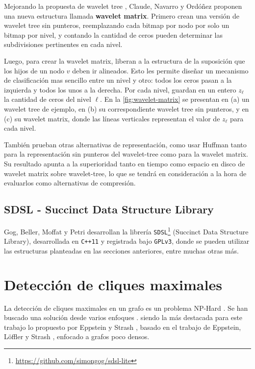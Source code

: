 Mejorando la propuesta de wavelet tree \cite{grossi2003high}, Claude, Navarro y Ordóñez \cite{claude2015wavelet} proponen una nueva estructura llamada \textbf{wavelet matrix}. Primero crean una versión de wavelet tree sin punteros, reemplazando cada bitmap por nodo por solo un bitmap por nivel, y contando la cantidad de ceros pueden determinar las subdivisiones pertinentes en cada nivel. 

Luego, para crear la wavelet matrix, liberan a la estructura de la suposición que los hijos de un nodo $v$ deben ir alineados. Esto les permite diseñar un mecanismo de clasificación mas sencillo entre un nivel y otro: todos los ceros pasan a la izquierda y todos los unos a la derecha. Por cada nivel, guardan en un entero $z_{\ell}$ la cantidad de ceros del nivel $\ell$. En la \autoref{fig:wavelet-matrix} se presentan en (a) un wavelet tree de ejemplo, en (b) su correspondiente wavelet tree sin punteros, y en (c) su wavelet matrix, donde las líneas verticales representan el valor de $z_{\ell}$ para cada nivel.



También prueban otras alternativas de representación, como usar Huffman \cite{huffman1952method} tanto para la representación sin punteros del wavelet-tree como para la wavelet matrix. Su resultado apunta a la superioridad tanto en tiempo como espacio en disco de wavelet matrix sobre wavelet-tree, lo que se tendrá en consideración a la hora de evaluarlos como alternativas de compresión.

\subsection{SDSL - Succinct Data Structure Library}
Gog, Beller, Moffat y Petri \cite{gbmp2014sea} desarrollan la librería \texttt{SDSL}\footnote{\url{https://github.com/simongog/sdsl-lite}} (Succinct Data Structure Library), desarrollada en \texttt{C++11} y registrada bajo \texttt{GPLv3}, donde se pueden utilizar las estructuras planteadas en las secciones anteriores, entre muchas otras más.



\section{Detección de cliques maximales} \label{sec:Cliques}
La detección de cliques maximales en un grafo es un problema NP-Hard \cite{karp1972reducibility}. Se han buscado una solución desde varios enfoques \cite{bron1973algorithm, eblen2012maximum, hendrix2010theoretical, bomze1999maximum, eppstein2010listing, eppstein2011listing}. siendo la más destacada para este trabajo lo propuesto por Eppstein y Strash \cite{eppstein2011listing}, basado en el trabajo de Eppstein, Löffler y Strash \cite{eppstein2010listing}, enfocado a grafos poco densos.

